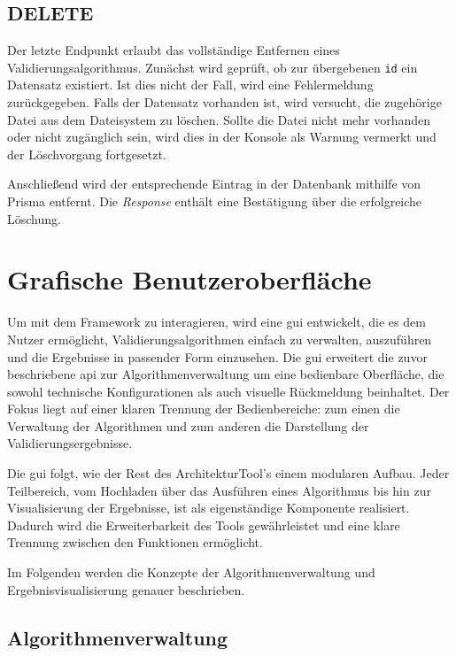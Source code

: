 \subsection{DELETE}


Der letzte Endpunkt erlaubt das vollständige Entfernen eines Validierungsalgorithmus. Zunächst wird geprüft, ob zur übergebenen \texttt{id} ein Datensatz existiert. Ist dies nicht der Fall, wird eine Fehlermeldung zurückgegeben. Falls der Datensatz vorhanden ist, wird versucht, die zugehörige Datei aus dem Dateisystem zu löschen. Sollte die Datei nicht mehr vorhanden oder nicht zugänglich sein, wird dies in der Konsole als Warnung vermerkt und der Löschvorgang fortgesetzt.

Anschließend wird der entsprechende Eintrag in der Datenbank mithilfe von Prisma entfernt. Die \textit{Response} enthält eine Bestätigung über die erfolgreiche Löschung.

\section{Grafische Benutzeroberfläche}
\label{sec:gui}


Um mit dem Framework zu interagieren, wird eine \gls{gui} entwickelt, die es dem Nutzer ermöglicht, Validierungsalgorithmen einfach zu verwalten, auszuführen und die Ergebnisse in passender Form einzusehen. Die \gls{gui} erweitert die zuvor beschriebene \gls{api} zur Algorithmenverwaltung um eine bedienbare Oberfläche, die sowohl technische Konfigurationen als auch visuelle Rückmeldung beinhaltet. Der Fokus liegt auf einer klaren Trennung der Bedienbereiche: zum einen die Verwaltung der Algorithmen und zum anderen die Darstellung der Validierungsergebnisse.

Die \gls{gui} folgt, wie der Rest des ArchitekturTool's einem modularen Aufbau. Jeder Teilbereich, vom Hochladen über das Ausführen eines Algorithmus bis hin zur Visualisierung der Ergebnisse, ist als eigenständige Komponente realisiert. Dadurch wird die Erweiterbarkeit des Tools gewährleistet und eine klare Trennung zwischen den Funktionen ermöglicht.

Im Folgenden werden die Konzepte der Algorithmenverwaltung und Ergebnisvisualisierung genauer beschrieben.

\subsection{Algorithmenverwaltung}
\label{subsec:gui_verwaltung}


